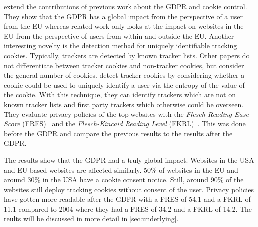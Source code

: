 \citeauthor{sanchez2019can} extend the contributions of previous work about the GDPR and cookie control. They show that
the GDPR has a global impact from the perspective of a user from the EU whereas related work only looks at the impact on
websites in the EU from the perspective of users from within and outside the EU. Another interesting novelty is the
detection method for uniquely identifiable tracking cookies. Typically, trackers are detected by known tracker lists.
Other papers do not differentiate between tracker cookies and non-tracker cookies, but consider the general number of
cookies. \citeauthor{sanchez2019can} detect tracker cookies by considering whether a cookie could be used to uniquely
identify a user via the entropy of the value of the cookie. With this technique, they can identify trackers which are not on known
tracker lists and first party trackers which otherwise could be overseen. They evaluate privacy policies of the top
websites with the \emph{Flesch Reading Ease Score} (FRES)~\cite{flesch1948new}
and the \emph{Flesch-Kincaid Reading Level} (FKRL)~\cite{kincaid1975derivation}.
This was done before the GDPR and \citeauthor{sanchez2019can} compare the previous results to the results after the
GDPR.

The results show that the GDPR had a truly global impact. Websites in the USA and EU-based websites are affected
similarly. 50\% of websites in the EU and around 30\% in the USA have a cookie consent notice. Still, around 90\% of the
websites still deploy tracking cookies without consent of the user.
Privacy policies have gotten more readable after the GDPR with a FRES of 54.1 and a FKRL of 11.1 compared to 2004 where they had a
FRES of 34.2 and a FKRL of 14.2. The reults will be discussed in more detail in \autoref{sec:underlying}.

